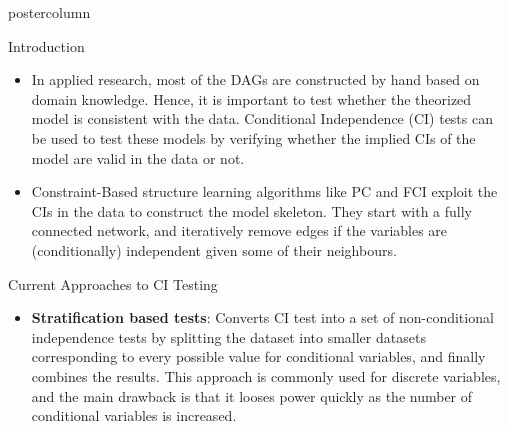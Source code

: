 \documentclass{beamer}
\def\ci{\perp\!\!\!\!\!\perp}
\begin{document}
\begin{frame}
\begin{columns}
\begin{column}{.33\textwidth}
\begin{beamercolorbox}[center]{postercolumn}
\begin{minipage}{.98\textwidth}
{\begin{myblock}{Introduction}
	\begin{itemize}
		\item In applied research, most of the DAGs are constructed by
			hand based on domain knowledge. Hence, it is important
			to test whether the theorized model is consistent with
			the data. Conditional Independence (CI) tests can be
			used to test these models by verifying whether the
			implied CIs of the model are valid in the data or not.
		\item Constraint-Based structure learning algorithms like PC and FCI exploit
			the CIs in the data to construct the model skeleton. They start with
			a fully connected network, and iteratively remove edges if the variables 
			are (conditionally) independent given some of their neighbours.
	\end{itemize}

					\end{myblock}\vfill
					\begin{myblock}{Current Approaches to CI Testing}
						\begin{itemize}
							\item \textbf{Stratification based tests}: Converts CI
								test into a set of non-conditional independence tests
								by splitting the dataset into smaller datasets corresponding to
								every possible value for conditional variables, and finally combines 
								the results. This approach is commonly used for discrete variables, and
								the main drawback is that it looses power quickly as the number of conditional variables
								is increased.


\end{itemize}
\end{myblock}}
\end{minipage}
\end{beamercolorbox}
\end{column}
\end{columns}
\end{frame}
\end{document}
